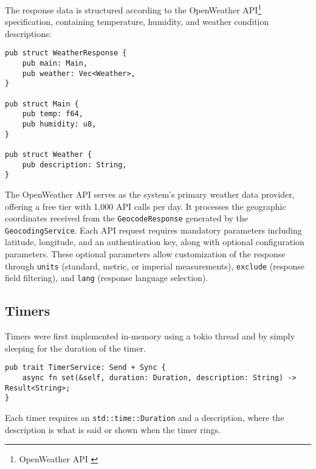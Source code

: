 The response data is structured according to the OpenWeather API\footnote{OpenWeather API \cite{openweathermap}} specification,
containing temperature, humidity, and weather condition descriptions:

\begin{verbatim}
pub struct WeatherResponse {
    pub main: Main,
    pub weather: Vec<Weather>,
}

pub struct Main {
    pub temp: f64,
    pub humidity: u8,
}

pub struct Weather {
    pub description: String,
}
\end{verbatim}

The OpenWeather API serves as the system's primary weather data provider, offering a free tier with 1,000 API calls per day.
It processes the geographic coordinates received from the \texttt{GeocodeResponse} generated by the \texttt{GeocodingService}.
Each API request requires mandatory parameters including latitude, longitude, and an authentication key, along with optional configuration parameters.
These optional parameters allow customization of the response through \texttt{units} (standard, metric, or imperial measurements),
\texttt{exclude} (response field filtering), and \texttt{lang} (response language selection).

\subsection{Timers}
Timers were first implemented in-memory using a tokio thread and by simply sleeping for the duration of the timer.

\begin{verbatim}
pub trait TimerService: Send + Sync {
    async fn set(&self, duration: Duration, description: String) -> Result<String>;
}
\end{verbatim}

Each timer requires an \texttt{std::time::Duration} and a description, where the description is what is said or shown when the timer rings.
